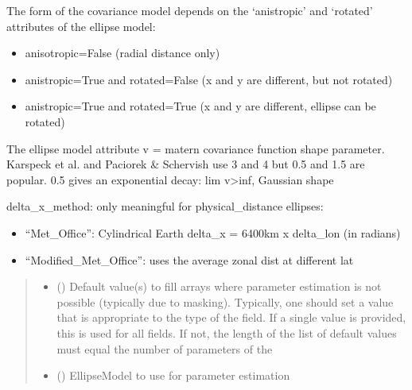 \documentclass[letterpaper,10pt,english]{sphinxmanual}
\begin{document}
\begin{fulllineitems}
\begin{fulllineitems}
\sphinxAtStartPar
The form of the covariance model depends on the ‘anistropic’ and
‘rotated’ attributes of the ellipse model:
\begin{itemize}
\item {}
\sphinxAtStartPar
anisotropic=False (radial distance only)

\item {}
\sphinxAtStartPar
anistropic=True and rotated=False (x and y are different, but not
rotated)

\item {}
\sphinxAtStartPar
anistropic=True and rotated=True (x and y are different, ellipse can
be rotated)

\end{itemize}

\sphinxAtStartPar
The ellipse model attribute v = matern covariance function shape
parameter.
Karspeck et al.  and Paciorek \& Schervish
use 3 and 4 but 0.5 and 1.5 are popular. 0.5 gives an exponential decay:
lim v\textendash{}\textgreater{}inf, Gaussian shape

\sphinxAtStartPar
delta\_x\_method: only meaningful for physical\_distance ellipses:
\begin{itemize}
\item {}
\sphinxAtStartPar
“Met\_Office”: Cylindrical Earth delta\_x = 6400km x delta\_lon
(in radians)

\item {}
\sphinxAtStartPar
“Modified\_Met\_Office”: uses the average zonal dist at different
lat

\end{itemize}
\begin{quote}\begin{description}
\begin{itemize}
\item {}
\sphinxAtStartPar
{} () \textendash{} Default value(s) to fill arrays where parameter estimation is not
possible (typically due to masking). Typically, one should set a
value that is appropriate to the type of the field. If a single
value is provided, this is used for all fields. If not, the length
of the list of default values must equal the number of parameters
of the 

\item {}
\sphinxAtStartPar
{} () \textendash{} EllipseModel to use for parameter estimation


\end{itemize}
\end{description}
\end{quote}
\end{fulllineitems}
\end{fulllineitems}
\end{document}
